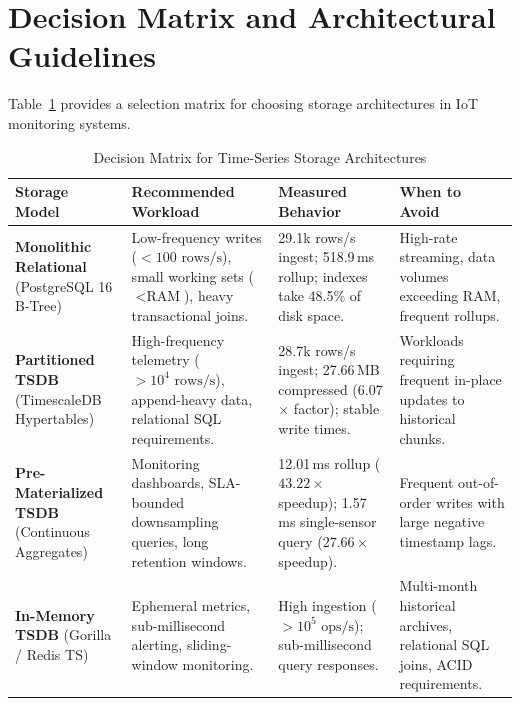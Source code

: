 \documentclass[conference,a4paper]{IEEEtran}
\begin{document}
\section{Decision Matrix and Architectural Guidelines}
Table~\ref{tab:decision} provides a selection matrix for choosing storage architectures in IoT monitoring systems.

\begin{table}[t]
\caption{Decision Matrix for Time-Series Storage Architectures}
\label{tab:decision}
\centering
\footnotesize
\begin{tabularx}{\textwidth}{@{}p{3.2cm}XXX@{}}
\toprule
\textbf{Storage Model} & \textbf{Recommended Workload} & \textbf{Measured Behavior} & \textbf{When to Avoid} \\ \midrule
\textbf{Monolithic Relational} (PostgreSQL 16 B-Tree) & Low-frequency writes ($<100\text{ rows/s}$), small working sets ($<\text{RAM}$), heavy transactional joins. & 29.1k rows/s ingest; 518.9\,ms rollup; indexes take 48.5\% of disk space. & High-rate streaming, data volumes exceeding RAM, frequent rollups. \\ \addlinespace[0.4ex]
\textbf{Partitioned TSDB} (TimescaleDB Hypertables) & High-frequency telemetry ($>10^4\text{ rows/s}$), append-heavy data, relational SQL requirements. & 28.7k rows/s ingest; 27.66\,MB compressed (6.07$\times$ factor); stable write times. & Workloads requiring frequent in-place updates to historical chunks. \\ \addlinespace[0.4ex]
\textbf{Pre-Materialized TSDB} (Continuous Aggregates) & Monitoring dashboards, SLA-bounded downsampling queries, long retention windows. & 12.01\,ms rollup ($43.22\times$ speedup); 1.57\,ms single-sensor query ($27.66\times$ speedup). & Frequent out-of-order writes with large negative timestamp lags. \\ \addlinespace[0.4ex]
\textbf{In-Memory TSDB} (Gorilla / Redis TS) & Ephemeral metrics, sub-millisecond alerting, sliding-window monitoring. & High ingestion ($>10^5\text{ ops/s}$); sub-millisecond query responses. & Multi-month historical archives, relational SQL joins, ACID requirements. \\ \bottomrule
\end{tabularx}
\end{table}

\end{document}
